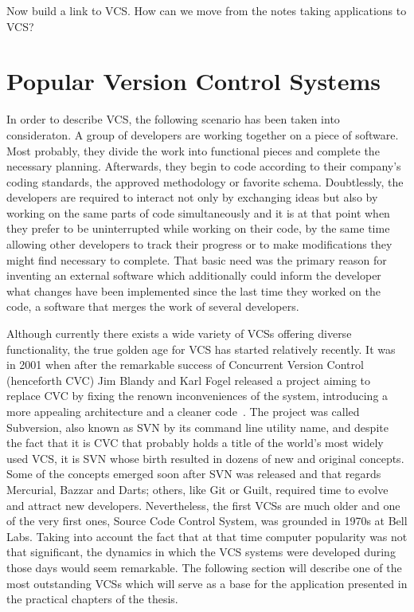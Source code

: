 Now build a link to VCS. How can we move from the notes taking applications to VCS? 
 
\section{Popular Version Control Systems}\label{sec:popular_vcs}
In order to describe VCS, the following scenario has been taken into consideraton. A group of developers are working together on a piece of software. Most probably, they divide the work into functional pieces and complete the necessary planning. Afterwards, they begin to code according to their company's coding standards, the approved methodology or favorite schema. Doubtlessly, the developers are required to interact not only by exchanging ideas but also by working on the same parts of code simultaneously and it is at that point when they prefer to be uninterrupted while working on their code, by the same time allowing other developers to track their progress or to make modifications they might find necessary to complete. That basic need was the primary reason for inventing an external software which additionally could inform the developer what changes have been implemented since the last time they worked on the code, a software that merges the work of several developers. 

Although currently there exists a wide variety of VCSs offering diverse functionality, the true golden age for VCS has started relatively recently. It was in 2001 when after the remarkable success of Concurrent Version Control (henceforth CVC) Jim Blandy and Karl Fogel released a project aiming to replace CVC by fixing the renown inconveniences of the system, introducing a more appealing architecture and a cleaner code~\cite[page 11]{hg_book}. The project was called Subversion, also known as SVN by its command line utility name, and despite the fact that it is CVC that probably holds a title of the world's most widely used VCS, it is SVN whose birth resulted in dozens of new and original concepts. Some of the concepts emerged soon after SVN was released and that regards Mercurial, Bazzar and Darts; others, like Git or Guilt, required time to evolve and attract new developers. Nevertheless, the first VCSs are much older and one of the very first ones, Source Code Control System, was grounded in 1970s at Bell Labs. Taking into account the fact that at that time computer popularity was not that significant, the dynamics in which the VCS systems were developed during those days would seem remarkable. The following section will describe one of the most outstanding VCSs which will serve as a base for the application presented in the practical chapters of the thesis.

